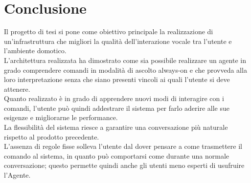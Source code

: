 \documentclass[twoside]{supsistudent}
\begin{document}
\chapter{Conclusione}
Il progetto di tesi si pone come obiettivo principale la realizzazione di un'infrastruttura che migliori la qualità dell'interazione vocale tra l'utente e l'ambiente domotico.\\
L'architettura realizzata ha dimostrato come sia possibile realizzare un agente in grado comprendere comandi in modalità di ascolto always-on e che provveda alla loro interpretazione senza che siano presenti vincoli ai quali l'utente si deve attenere.\\
Quanto realizzato è in grado di apprendere nuovi modi di interagire con i comandi, l'utente può quindi addestrare il sistema per farlo aderire alle sue esigenze e migliorarne le performance.\\
La flessibilità del sistema riesce a garantire una conversazione più naturale rispetto al prodotto precedente.\\
L’assenza di regole fisse solleva l’utente dal dover pensare a come trasmettere il comando al sistema, in quanto può comportarsi come durante una normale conversazione; questo permette quindi anche gli utenti meno esperti di usufruire l'Agente.\\
\end{document}
